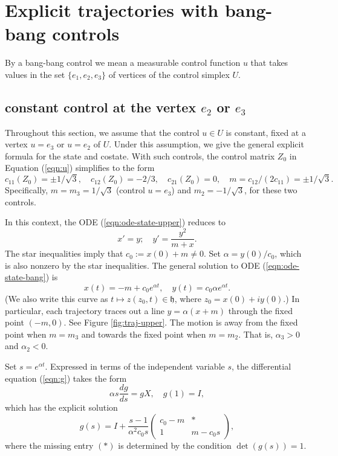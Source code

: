 \documentclass{article}
\theoremstyle{remark}
\def\h{\mathfrak h}
\begin{document}
\section{Explicit trajectories with bang-bang controls}

By a bang-bang control we mean a measurable control function $u$ that
takes values in the set $\{e_1,e_2,e_3\}$ of vertices of the control
simplex $U$.

\subsection{constant control at the vertex $e_2$ or $e_3$}
\label{sec:e2e3}

Throughout this section, we assume that the control $u\in U$ is
constant, fixed at a vertex $u=e_3$ or $u=e_2$ of $U$.
Under this assumption, we give
the general explicit formula for the state and costate.  
With such controls, the control matrix $Z_0$ in Equation
(\ref{eqn:u}) simplifies to the form
\[
c_{11}(Z_0) = \pm 1/\sqrt{3},\quad c_{12}(Z_0) = -2/3,
\quad c_{21}(Z_0) = 0,\quad m = c_{12}/(2 c_{11}) = \pm 1/\sqrt{3}.
\]
Specifically, $m=m_3=1/\sqrt{3}$ (control $u=e_3$) and $m_2= - 1/\sqrt{3}$,
for these two controls.


In this context, the ODE (\ref{eqn:ode-state-upper}) reduces to
\begin{equation}\label{eqn:ode-state-bang}
x'  = y;\quad y' = \frac{y^2}{m + x}.
\end{equation}
The star inequalities imply that $c_0:= x(0)+m\ne 0$. Set $\alpha =
y(0)/c_0$, which is also nonzero by the star inequalities.  The
general solution to ODE (\ref{eqn:ode-state-bang}) is
\begin{equation}\label{eqn:alpha}
x(t) = -m + c_0 e^{\alpha t},\quad y(t) = c_0 \alpha e^{\alpha t}.
\end{equation}
(We also write this curve as $t\mapsto z(z_0,t)\in \h$, where
$z_0=x(0)+iy(0)$.)  In particular, each trajectory traces out a line
$y = \alpha (x+m)$ through the fixed point $(-m,0)$.  See Figure
\ref{fig:traj-upper}.  The motion is away from the fixed point when
$m=m_3$ and towards the fixed point when $m=m_2$.  That is,
$\alpha_3>0$ and $\alpha_2<0$.


Set $s= e^{\alpha t}$.  Expressed in terms of the independent variable $s$, 
the differential equation (\ref{eqn:g}) takes the form
\[
\alpha s\frac{dg}{ds} = g X,\quad g(1)=I,
\]
which has the explicit solution
\[
g(s) = I + \frac{s-1}{\alpha^2 c_0 s}\begin{pmatrix}
c_0-m & * \\
1 & 
 m-c_0 s
\end{pmatrix},
\]
where the missing entry $(*)$ is determined by the condition
$\det(g(s))=1$.
\end{document}
